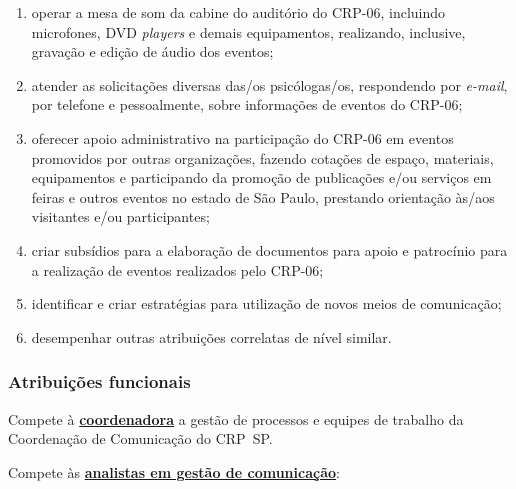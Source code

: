 \begin{enumerate}
        espaços para a realização de eventos, analisando as adequações de
        localização e infraestrutura;
  \item
        operar a mesa de som da cabine do auditório do CRP-06, incluindo
        microfones, DVD \emph{players} e demais equipamentos, realizando,
        inclusive, gravação e edição de áudio dos eventos;
  \item
        atender as solicitações diversas das/os psicólogas/os, respondendo por
        \emph{e-mail}, por telefone e pessoalmente, sobre informações de
        eventos do CRP-06;
  \item
        oferecer apoio administrativo na participação do CRP-06 em eventos
        promovidos por outras organizações, fazendo cotações de espaço,
        materiais, equipamentos e participando da promoção de publicações e/ou
        serviços em feiras e outros eventos no estado de São Paulo, prestando
        orientação às/aos visitantes e/ou participantes;
  \item
        criar subsídios para a elaboração de documentos para apoio e
        patrocínio para a realização de eventos realizados pelo CRP-06;
  \item
        identificar e criar estratégias para utilização de novos meios de
        comunicação;
  \item
        desempenhar outras atribuições correlatas de nível similar.
\end{enumerate}

\subsubsection{Atribuições funcionais}

Compete à
\href{https://transparencia.cfp.org.br/crp06/wp-content/uploads/sites/29/2022/09/Resolucao-03-22-PECS-Anexo-II-Regulamentacao-Plano-de-Empregos-Carreiras-e-Salarios-f-assinada.pdf}{\textbf{coordenadora}}
a gestão de processos e equipes de trabalho da Coordenação de
Comunicação do CRP~SP.

Compete às
\href{https://transparencia.cfp.org.br/crp06/wp-content/uploads/sites/29/2022/09/Resolucao-03-22-PECS-Anexo-II-Regulamentacao-Plano-de-Empregos-Carreiras-e-Salarios-f-assinada.pdf}{\textbf{analistas
    em gestão de comunicação}}:

